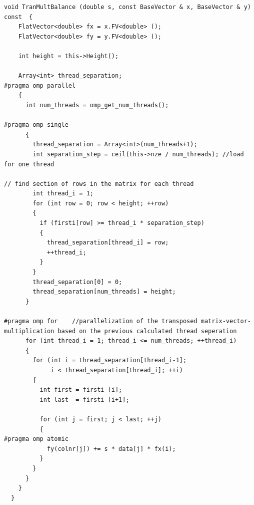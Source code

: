 \documentclass[a4paper,11pt]{scrartcl}
\begin{document}
\begin{lstlisting}
void TranMultBalance (double s, const BaseVector & x, BaseVector & y) const  {
    FlatVector<double> fx = x.FV<double> ();
    FlatVector<double> fy = y.FV<double> ();

    int height = this->Height();

    Array<int> thread_separation;
#pragma omp parallel 
    {
      int num_threads = omp_get_num_threads();

#pragma omp single
      {
        thread_separation = Array<int>(num_threads+1);
        int separation_step = ceil(this->nze / num_threads); //load for one thread

// find section of rows in the matrix for each thread
        int thread_i = 1;
        for (int row = 0; row < height; ++row)
        {
          if (firsti[row] >= thread_i * separation_step)
          {
            thread_separation[thread_i] = row;
            ++thread_i;
          }
        }
        thread_separation[0] = 0;
        thread_separation[num_threads] = height;
      }

#pragma omp for    //parallelization of the transposed matrix-vector-multiplication based on the previous calculated thread seperation
      for (int thread_i = 1; thread_i <= num_threads; ++thread_i)
      {
        for (int i = thread_separation[thread_i-1];
             i < thread_separation[thread_i]; ++i)
        {
          int first = firsti [i];
          int last  = firsti [i+1];

          for (int j = first; j < last; ++j)
          {
#pragma omp atomic
            fy(colnr[j]) += s * data[j] * fx(i);
          }
        }
      }
    }
  }

\end{lstlisting}
\end{document}
